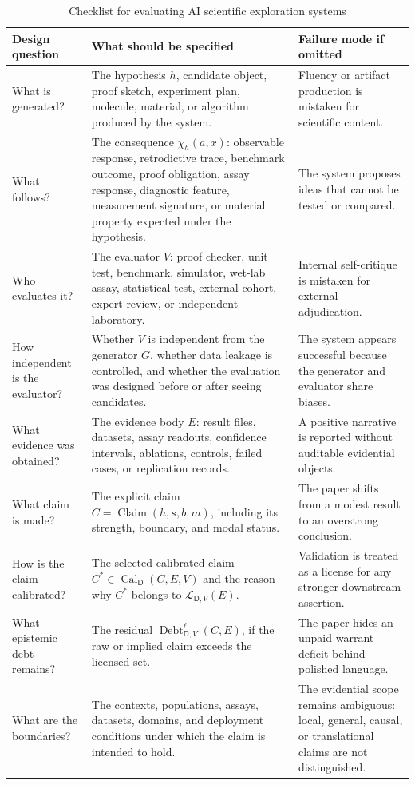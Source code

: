 \documentclass[11pt,a4paper]{article}
\newcommand{\Claim}{\operatorname{Claim}}
\newcommand{\Cal}{\operatorname{Cal}}
\newcommand{\Debt}{\operatorname{Debt}}
\newcommand{\Dom}{\mathsf{D}}
\begin{document}
\begin{table}[H]
\centering
\scriptsize
\caption{Checklist for evaluating AI scientific exploration systems}
\begin{tabularx}{\textwidth}{@{}p{3.1cm}Y Y@{}}
\toprule
Design question & What should be specified & Failure mode if omitted \\
\midrule
What is generated? & The hypothesis $h$, candidate object, proof sketch, experiment plan, molecule, material, or algorithm produced by the system. & Fluency or artifact production is mistaken for scientific content. \\
What follows? & The consequence $\chi_h(a,x)$: observable response, retrodictive trace, benchmark outcome, proof obligation, assay response, diagnostic feature, measurement signature, or material property expected under the hypothesis. & The system proposes ideas that cannot be tested or compared. \\
Who evaluates it? & The evaluator $V$: proof checker, unit test, benchmark, simulator, wet-lab assay, statistical test, external cohort, expert review, or independent laboratory. & Internal self-critique is mistaken for external adjudication. \\
How independent is the evaluator? & Whether $V$ is independent from the generator $G$, whether data leakage is controlled, and whether the evaluation was designed before or after seeing candidates. & The system appears successful because the generator and evaluator share biases. \\
What evidence was obtained? & The evidence body $E$: result files, datasets, assay readouts, confidence intervals, ablations, controls, failed cases, or replication records. & A positive narrative is reported without auditable evidential objects. \\
What claim is made? & The explicit claim $C=\Claim(h,s,b,m)$, including its strength, boundary, and modal status. & The paper shifts from a modest result to an overstrong conclusion. \\
How is the claim calibrated? & The selected calibrated claim $C^\ast\in\Cal_{\Dom}(C,E,V)$ and the reason why $C^\ast$ belongs to $\mathcal{L}_{\Dom,V}(E)$. & Validation is treated as a license for any stronger downstream assertion. \\
What epistemic debt remains? & The residual $\Debt^\ell_{\Dom,V}(C,E)$, if the raw or implied claim exceeds the licensed set. & The paper hides an unpaid warrant deficit behind polished language. \\
What are the boundaries? & The contexts, populations, assays, datasets, domains, and deployment conditions under which the claim is intended to hold. & The evidential scope remains ambiguous: local, general, causal, or translational claims are not distinguished. \\
\bottomrule
\end{tabularx}
\end{table}
\FloatBarrier
\end{document}
